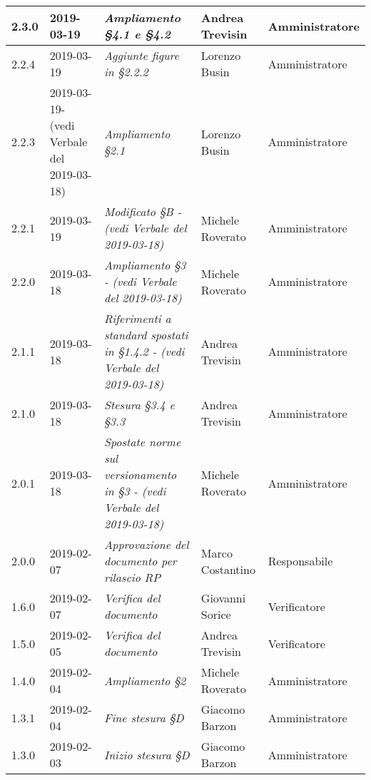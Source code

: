 \begin{longtable}{C{2cm}|C{2.5cm}|C{4.5cm}|C{2.5cm}|C{3cm}}
		2.3.0 & 2019-03-19 & \emph{Ampliamento §4.1 e §4.2} & Andrea Trevisin & Amministratore \\
		\hline
		
		2.2.4 & 2019-03-19 & \emph{Aggiunte figure in §2.2.2} & Lorenzo Busin & Amministratore \\
		\hline
		
		2.2.3 & 2019-03-19- (vedi Verbale del 2019-03-18) & \emph{Ampliamento §2.1} & Lorenzo Busin & Amministratore \\
		\hline
		
		2.2.1 & 2019-03-19 & \emph{Modificato §B - (vedi Verbale del 2019-03-18)} & Michele Roverato & Amministratore \\
		\hline
		
		2.2.0 & 2019-03-18 & \emph{Ampliamento §3 - (vedi Verbale del 2019-03-18)} & Michele Roverato & Amministratore \\
		\hline
		
		2.1.1 & 2019-03-18 & \emph{Riferimenti a standard spostati in §1.4.2 - (vedi Verbale del 2019-03-18)} & Andrea Trevisin & Amministratore \\
		\hline
		
		2.1.0 & 2019-03-18 & \emph{Stesura §3.4 e §3.3} & Andrea Trevisin & Amministratore \\
		\hline
		
		2.0.1 & 2019-03-18 & \emph{Spostate norme sul versionamento in §3 - (vedi Verbale del 2019-03-18)} & Michele Roverato & Amministratore \\
		\hline
		
		2.0.0 & 2019-02-07 & \emph{Approvazione del documento per rilascio RP} & Marco Costantino & Responsabile \\
		\hline
		
		1.6.0 & 2019-02-07 & \emph{Verifica del documento}  & Giovanni Sorice & Verificatore  \\
		\hline
		
		1.5.0 & 2019-02-05 & \emph{Verifica del documento} & Andrea Trevisin & Verificatore  \\
		\hline
		
		1.4.0 & 2019-02-04 & \emph{Ampliamento §2} & Michele Roverato & Amministratore  \\
		\hline
		
		 1.3.1 & 2019-02-04 & \emph{Fine stesura §D} & Giacomo Barzon & Amministratore \\
		\hline
		
		1.3.0 & 2019-02-03 & \emph{Inizio stesura §D} & Giacomo Barzon & Amministratore  \\
		\hline
		

\end{longtable}

